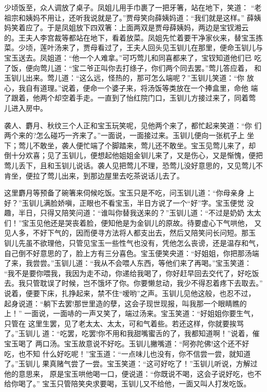 少顷饭至，众人调放了桌子。凤姐儿用手巾裹了一把牙箸，站在地下，笑道：
“老祖宗和姨妈不用让，还听我说就是了。”贾母笑向薛姨妈道：“我们就是这样。”
薛姨妈笑着应了。于是凤姐放下四双箸：上面两双是贾母薛姨妈，两边是宝钗湘云
的。王夫人李宫裁等都站在地下，看着放菜。凤姐先忙着要干净家伙来，替宝玉拣
菜。少顷，莲叶汤来了，贾母看过了，王夫人回头见玉钏儿在那里，便命玉钏儿与
宝玉送去。凤姐道：“他一个人难拿。”可巧莺儿和同喜都来了，宝钗知道他们已
吃了饭，便向莺儿道：“宝二爷正叫你去打绦子，你们两个同去罢。”莺儿答应着，
和玉钏儿出来。莺儿道：“这么远，怪热的，那可怎么端呢？”玉钏儿笑道：“你
放心，我自有道理。”说着，便命一个婆子来，将汤饭等类放在一个捧盒里，命他
端了跟着，他两个却空着手走。一直到了怡红院门口，玉钏儿方接过来了，同着莺
儿进入房中。

袭人、麝月、秋纹三个人正和宝玉玩笑呢，见他两个来了，都忙起来笑道：“你
们两个来的?怎么碰巧一齐来了。”一面说，一面接过来。玉钏儿便向一张杌子上
坐下；莺儿不敢坐，袭人便忙端了个脚踏来，莺儿还不敢坐。宝玉见莺儿来了，却
倒十分欢喜；见了玉钏儿，便想起他姐姐金钏儿来了，又是伤心，又是惭愧，便把
莺儿丢下，且和玉钏儿说话。袭人见把莺儿不理，恐莺儿没好意思的，又见莺儿不
肯坐，便拉了莺儿出来，到那边屋里去吃茶说话儿去了。

这里麝月等预备了碗箸来伺候吃饭。宝玉只是不吃，问玉钏儿道：“你母亲身
上好？”玉钏儿满脸娇嗔，正眼也不看宝玉，半日方说了一个“好”字。宝玉便觉
没趣，半日，只得又陪笑问道：“谁叫你替我送来的？”玉钏儿道：“不过是奶奶
太太们！”宝玉见他还是哭丧着脸，便知他是为金钏儿的原故。待要虚心下气哄他，
又见人多，不好下气的，因而便寻方法将人都支出去，然后又陪笑问长问短。那玉
钏儿先虽不欲理他，只管见宝玉一些性气也没有，凭他怎么丧谤，还是温存和气，
自己倒不好意思的了，脸上方有三分喜色。宝玉便笑央道：“好姐姐，你把那汤端
了来，我尝尝。”玉钏儿道：“我从不会喂人东西，等他们来了再喝。”宝玉笑道：
“我不是要你喂我，我因为走不动，你递给我喝了，你好赶早回去交代了，好吃饭
去。我只管耽误了时候，岂不饿坏了你。你要懒怠动，我少不得忍着疼下去取去。”
说着，便要下床，扎挣起来，禁不住“嗳哟”之声。玉钏儿见他这般，也忍不过，
起身说道：“躺下去罢!那世里造的孽，这会子现世现报，叫我那一个眼睛瞧的上！”
一面说，一面哧的一声又笑了，端过汤来。宝玉笑道：“好姐姐你要生气，只管在
这里生罢，见了老太太、太太，可和气着些。若还这样，你就要挨骂了。”玉钏儿
道：“吃罢，吃罢!你不用和我甜嘴蜜舌的了，我都知道啊！”说着，催宝玉喝了
两口汤。宝玉故意说不好吃。玉钏儿撇嘴道：“阿弥陀佛!这个还不好吃，也不知
什么好吃呢！”宝玉道：“一点味儿也没有，你不信尝一尝，就知道了。”玉钏儿
果真赌气尝了一尝。宝玉笑道：“这可好吃了！”玉钏儿听说，方解过他的意思来，
原是宝玉哄他喝一口，便说道：“你既说不喝，这会子说好吃，也不给你喝了。”
宝玉只管陪笑央求要喝，玉钏儿又不给他，一面又叫人打发吃饭。

